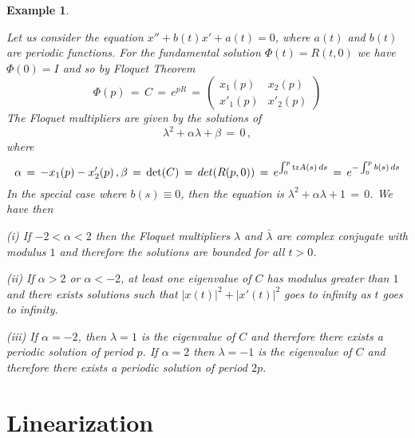 \documentclass[12pt]{report}
\newtheorem{example}[theorem]{Example}
\begin{document}
\begin{example}\label{per2lin}
{\rm Let us consider the equation $x'' + b(t)x' + a(t) =0$, where
$a(t)$ and $b(t)$ are periodic functions. For the fundamental solution 
$\Phi(t)=R(t,0)$ we have $\Phi(0)= I$ and so by Floquet Theorem
\begin{equation}
\Phi(p)\,=\,  C\,=\, e^{pR}\,=\, 
\left( \begin{array}{cc} x_1(p) & x_2(p) \\  x'_1(p) & x'_2(p) \end{array}
\right)
\end{equation}
The Floquet multipliers are given by the solutions of 
\begin{equation}
\lambda^2 + \alpha \lambda + \beta \,=\,0 \,,
\end{equation}
where 
\begin{equation}
\alpha \,=\, - x_1(p) -x'_2(p) \,,
\beta \,=\, \det(C) \,=\, det (R(p,0)) \,=\, e^{\int_0^p {\rm tr} A(s)\,ds} 
\,=\,  e^{-\int_0^p b(s)\,ds}
\end{equation}
In the special case where $b(s)\equiv 0$, then the equation is 
$\lambda^2 +\alpha \lambda +1\,=\,0$. We have then 

\noindent
(i) If $-2 < \alpha <2$ then the Floquet multipliers $\lambda$ and ${\bar \lambda}$ are complex
conjugate with modulus $1$ and therefore the solutions are bounded for
all $t>0$.

\noindent
(ii) If $\alpha >2$ or $\alpha <-2$, at least one eigenvalue of $C$ has 
modulus greater than $1$ and there exists solutions 
such that $|x(t)|^2 + |x'(t)|^2$ goes to infinity as $t$ goes to infinity.  

\noindent
(iii) If $\alpha=-2$, then $\lambda=1$ is the eigenvalue of $C$ and
therefore there exists a periodic solution of period $p$. 
If $\alpha =2$ then $\lambda=-1$ is the eigenvalue of $C$ and
therefore there exists a periodic solution of period $2p$. 
}
\end{example}



\section{Linearization}
\end{document}
